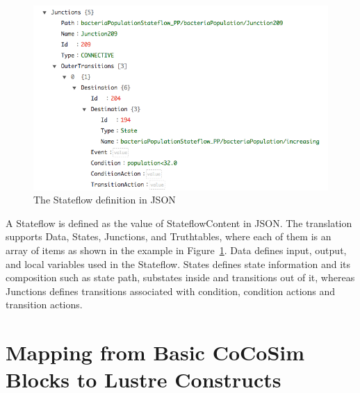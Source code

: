 \documentclass{article}
\begin{document}
\begin{figure}[h]
\begin{center}
\includegraphics[scale=0.35]{figures/junction}
\end{center}  
\caption{The Stateflow definition in JSON}
\label{stateflow_json}
\end{figure}

A Stateflow is defined as the value of \textsf{StateflowContent} in JSON.
The translation supports \textsf{Data}, \textsf{States}, \textsf{Junctions}, and \textsf{Truthtables}, where each of them
is an array of items as shown in the example in Figure~\ref{stateflow_json}.
\textsf{Data} defines input, output, and local variables used in the Stateflow.
\textsf{States} defines state information and its composition such as state path, substates inside and transitions out of it, whereas \textsf{Junctions} defines transitions associated with condition, condition actions and transition actions.


\section{Mapping from Basic CoCoSim Blocks to Lustre Constructs}
\end{document}
